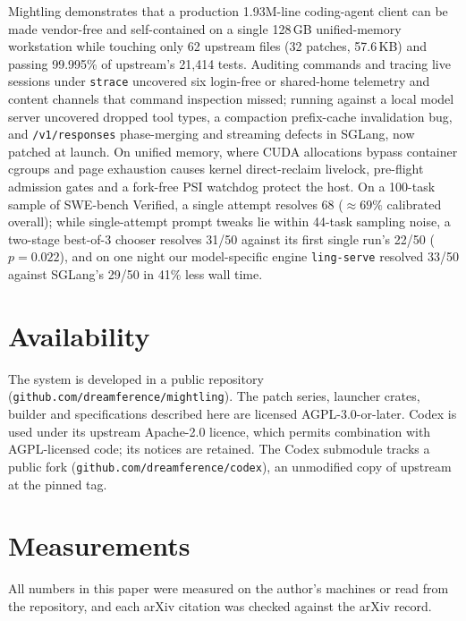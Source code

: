 \documentclass[11pt]{article}
\newcommand{\code}[1]{\texttt{#1}}
\begin{document}
Mightling demonstrates that a production 1.93M-line coding-agent client can be made vendor-free and
self-contained on a single 128\,GB unified-memory workstation while touching only 62 upstream files
(32 patches, 57.6\,KB) and passing 99.995\% of upstream's 21{,}414 tests. Auditing commands and
tracing live sessions under \code{strace} uncovered six login-free or shared-home telemetry and
content channels that command inspection missed; running against a local model server uncovered
dropped tool types, a compaction prefix-cache invalidation bug, and \code{/v1/responses}
phase-merging and streaming defects in SGLang, now patched at launch. On
unified memory, where CUDA allocations bypass container cgroups and page exhaustion causes kernel
direct-reclaim livelock, pre-flight admission gates and a fork-free PSI watchdog protect the host.
On a 100-task sample of SWE-bench Verified, a single attempt resolves 68 ($\approx 69\%$ calibrated
overall); while single-attempt prompt tweaks lie within 44-task sampling noise, a two-stage
best-of-3 chooser resolves 31/50 against its first single run's 22/50 ($p = 0.022$), and on one
night our model-specific engine \code{ling-serve} resolved 33/50 against SGLang's 29/50 in 41\% less
wall time.

\section*{Availability}
The system is developed in a public repository (\code{github.com/dreamference/mightling}). The
patch series, launcher crates, builder and specifications described here are licensed
AGPL-3.0-or-later. Codex is used under its upstream Apache-2.0 licence, which permits combination
with AGPL-licensed code; its notices are retained. The Codex submodule tracks a public fork
(\code{github.com/dreamference/codex}), an unmodified copy of upstream at the pinned tag.

\section*{Measurements}
All numbers in this paper were measured on the author's machines or read from the repository,
and each arXiv citation was checked against the arXiv record.



\end{document}
